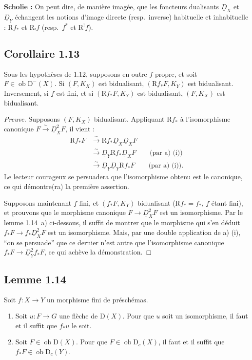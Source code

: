 \documentclass[11pt]{article}
\newcommand{\R}{\mathrm{R}}
\newcommand{\D}{\mathrm{D}}
\newcommand{\ob}{\operatorname{ob}}
\providecommand{\ob}{\operatorname{ob}}
\providecommand{\R}{\mathrm R}
\begin{document}
\textbf{Scholie :} On peut dire, de manière imagée, que les foncteurs dualisants $\underline{D}_X$ et $\underline{D}_Y$ échangent les notions d'image directe (resp.~inverse) habituelle et inhabituelle : $\R f_{*}$ et $\R_{!}f$ (resp.~$f^{*}$ et $\R^{!}f$).

\subsection*{Corollaire 1.13}
Sous les hypothèses de 1.12, supposons en outre $f$ propre, et soit $F \in \ob \D^{-}(X)$. Si $(F, K_X)$ est bidualisant, $(\R f_{*}F, K_Y)$ est bidualisant. Inversement, si $f$ est fini, et si $(\R f_{*}F, K_Y)$ est bidualisant, $(F, K_X)$ est bidualisant.

\begin{proof}[Preuve]
Supposons $(F, K_X)$ bidualisant. Appliquant $\R f_{*}$ à l'isomorphisme canonique $F \xrightarrow{\sim} \underline{D}_X^{2} F$, il vient :
\begin{align*}
\R f_{*} F &\xrightarrow{\sim} \R f_{*} \underline{D}_X \underline{D}_X F \\
&\xrightarrow{\sim} \underline{D}_Y \R f_{*} \underline{D}_X F \qquad \text{(par a) (i))} \\
&\xrightarrow{\sim} \underline{D}_Y \underline{D}_Y \R f_{*} F \qquad \text{(par a) (i)).}
\end{align*}
Le lecteur courageux se persuadera que l'isomorphisme obtenu est le canonique, ce qui démontre(ra) la première assertion.

Supposons maintenant $f$ fini, et $(f_{*}F, K_Y)$ bidualisant ($\R f_{*} = f_{*}$, $f$ étant fini), et prouvons que le morphisme canonique $F \to \underline{D}_X^{2} F$ est un isomorphisme. Par le lemme 1.14~a) ci-dessous, il suffit de montrer que le morphisme qui s'en déduit $f_{*}F \to f_{*}\underline{D}_X^{2} F$ est un isomorphisme. Mais, par une double application de a) (i), ``on se persuade'' que ce dernier n'est autre que l'isomorphisme canonique $f_{*}F \to \underline{D}_Y^{2} f_{*}F$, ce qui achève la démonstration.
\end{proof}

\subsection*{Lemme 1.14}
Soit $f : X \to Y$ un morphisme fini de préschémas.
\begin{enumerate}
\item[a)] Soit $u : F \to G$ une flèche de $\D(X)$. Pour que $u$ soit un isomorphisme, il faut et il suffit que $f_{*}u$ le soit.
\item[b)] Soit $F \in \ob \D(X)$. Pour que $F \in \ob \D_c(X)$, il faut et il suffit que $f_{*}F \in \ob \D_c(Y)$.
\end{enumerate}
\end{document}
